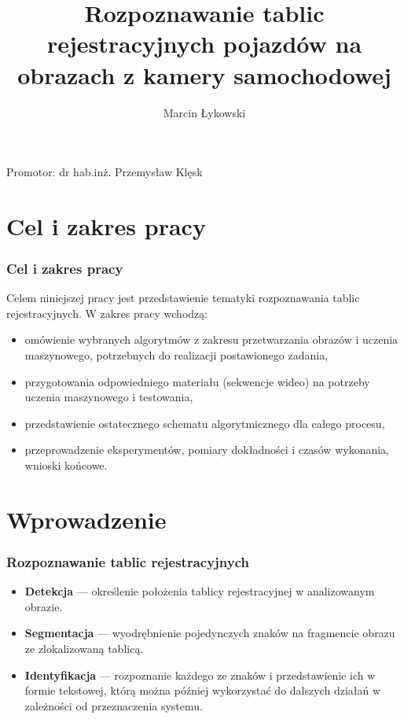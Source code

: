 \documentclass{beamer}
\title{Rozpoznawanie tablic rejestracyjnych pojazdów na obrazach z kamery samochodowej}
\author{Marcin Łykowski}
\begin{document}
    \begin{frame}
        \maketitle
        \centering
        Promotor: dr hab.inż. Przemysław Klęsk
    \end{frame}


    \section{Cel i zakres pracy}
    \begin{frame}
        \frametitle{Cel i zakres pracy}
        Celem niniejszej pracy jest przedstawienie tematyki rozpoznawania tablic rejestracyjnych.
        W zakres pracy wchodzą:
        \begin{itemize}
            \item omówienie wybranych algorytmów z zakresu przetwarzania obrazów i uczenia maszynowego, potrzebnych do realizacji postawionego zadania,
            \item przygotowania odpowiedniego materiału (sekwencje wideo) na potrzeby uczenia maszynowego i testowania,
            \item przedstawienie ostatecznego schematu algorytmicznego dla całego procesu,
            \item przeprowadzenie eksperymentów, pomiary dokładności i czasów wykonania, wnioski końcowe.
        \end{itemize}
    \end{frame}


    \section{Wprowadzenie}

    \begin{frame}
        \frametitle{Rozpoznawanie tablic rejestracyjnych}
        \begin{itemize}
            \item \textbf{Detekcja} --- określenie położenia tablicy rejestracyjnej w analizowanym obrazie.
            \item \textbf{Segmentacja} --- wyodrębnienie pojedynczych znaków na fragmencie obrazu ze zlokalizowaną tablicą.
            \item \textbf{Identyfikacja} --- rozpoznanie każdego ze znaków i przedstawienie ich w formie tekstowej, którą można później wykorzystać do dalszych działań w zależności od przeznaczenia systemu.
        \end{itemize}
    \end{frame}
\end{document}

